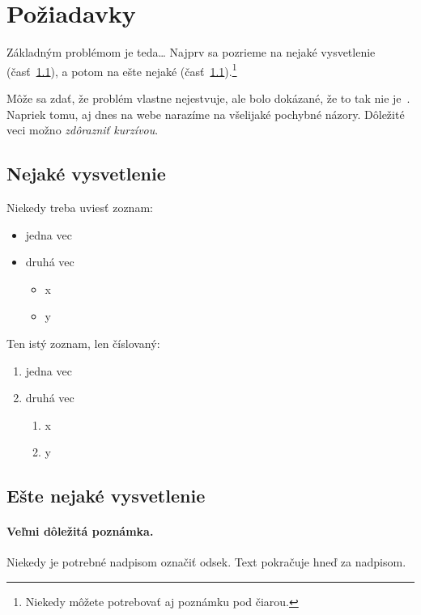 \documentclass[10pt,twoside,slovak,a4paper]{article}
\begin{document}
\section{Požiadavky} \label{poziadavky}

Základným problémom je teda\ldots{} Najprv sa pozrieme na nejaké vysvetlenie (časť~\ref{ina:nejake}), a potom na ešte nejaké (časť~\ref{ina:nejake}).\footnote{Niekedy môžete potrebovať aj poznámku pod čiarou.}

Môže sa zdať, že problém vlastne nejestvuje\cite{Coplien:MPD}, ale bolo dokázané, že to tak nie je~\cite{Czarnecki:Staged, Czarnecki:Progress}. Napriek tomu, aj dnes na webe narazíme na všelijaké pochybné názory\cite{PLP-Framework}. Dôležité veci možno \emph{zdôrazniť kurzívou}.


\subsection{Nejaké vysvetlenie} \label{ina:nejake}

Niekedy treba uviesť zoznam:

\begin{itemize}
\item jedna vec
\item druhá vec
	\begin{itemize}
	\item x
	\item y
	\end{itemize}
\end{itemize}

Ten istý zoznam, len číslovaný:

\begin{enumerate}
\item jedna vec
\item druhá vec
	\begin{enumerate}
	\item x
	\item y
	\end{enumerate}
\end{enumerate}


\subsection{Ešte nejaké vysvetlenie} \label{ina:este}

\paragraph{Veľmi dôležitá poznámka.}
Niekedy je potrebné nadpisom označiť odsek. Text pokračuje hneď za nadpisom.
\end{document}
